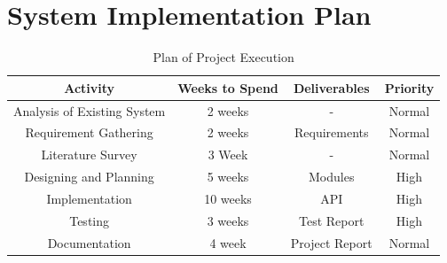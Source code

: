 \section{System Implementation Plan}
\begin{table}[!htbp]
\begin{center}
\def\arraystretch{1.5}
  \begin{tabular}{| c | c | c | c |}
       \hline

	\textbf{Activity} & \textbf{Weeks to Spend} & \textbf{Deliverables} & \textbf{Priority}\\ \hline
	Analysis of Existing System & 2 weeks & - & Normal \\ \hline
	Requirement Gathering & 2 weeks & Requirements & Normal \\ \hline 
	Literature Survey & 3 Week & - & Normal \\ \hline
	Designing and Planning & 5 weeks & Modules & High \\ \hline
	Implementation & 10 weeks & API & High \\ \hline
	Testing & 3 weeks & Test Report & High \\ \hline
	Documentation & 4 week & Project Report & Normal \\ \hline
\end{tabular}
 \caption { Plan of Project Execution }
 \label{tab:hreq}
\end{center}

\end{table}